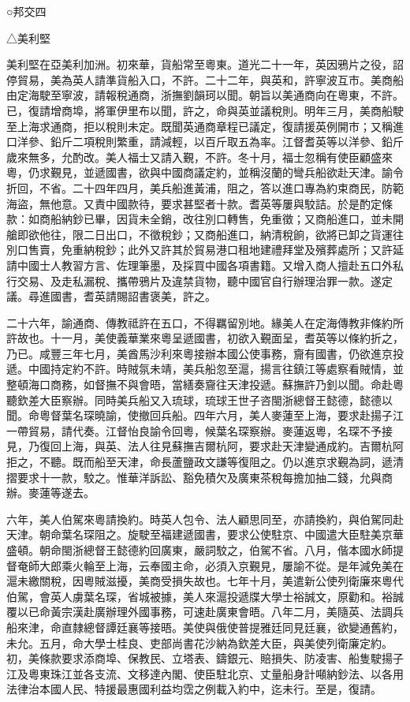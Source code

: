 
\begin{pinyinscope}
○邦交四

△美利堅

美利堅在亞美利加洲。初來華，貨船常至粵東。道光二十一年，英因鴉片之役，詔停貿易，美為英人請準貨船入口，不許。二十二年，與英和，許寧波互巿。美商船由定海駛至寧波，請報稅通商，浙撫劉韻珂以聞。朝旨以美通商向在粵東，不許。已，復請增商埠，將軍伊里布以聞，許之，命與英並議稅則。明年三月，美商船駛至上海求通商，拒以稅則未定。既聞英通商章程已議定，復請援英例開巿；又稱進口洋參、鉛斤二項稅則繁重，請減輕，以百斤取五為率。江督耆英等以洋參、鉛斤歲來無多，允酌改。美人福士又請入覲，不許。冬十月，福士忽稱有使臣顧盛來粵，仍求覲見，並遞國書，欲與中國商議定約，並稱沒蘭的彎兵船欲赴天津。諭令折回，不省。二十四年四月，美兵船進黃浦，阻之，答以進口專為約束商民，防範海盜，無他意。又責中國款待，要求甚堅者十款。耆英等屢與駮詰。於是酌定條款：如商船納鈔已畢，因貨未全銷，改往別口轉售，免重徵；又商船進口，並未開艙即欲他往，限二日出口，不徵稅鈔；又商船進口，納清稅餉，欲將已卸之貨運往別口售賣，免重納稅鈔；此外又許其於貿易港口租地建禮拜堂及殯葬處所；又許延請中國士人教習方言、佐理筆墨，及採買中國各項書籍。又增入商人擅赴五口外私行交易、及走私漏稅、攜帶鴉片及違禁貨物，聽中國官自行辦理治罪一款。遂定議。尋進國書，耆英請賜詔書褒美，許之。

二十六年，諭通商、傳教祗許在五口，不得羈留別地。緣美人在定海傳教非條約所許故也。十一月，美使義華業來粵呈遞國書，初欲入覲面呈，耆英等以條約折之，乃已。咸豐三年七月，美酋馬沙利來粵接辦本國公使事務，齎有國書，仍欲進京投遞。中國持定約不許。時賊氛未靖，美兵船忽至滬，揚言往鎮江等處察看賊情，並整頓海口商務，如督撫不與會晤，當繕奏齎往天津投遞。蘇撫許乃釗以聞。命赴粵聽欽差大臣察辦。同時美兵船又入琉球，琉球王世子咨閩浙總督王懿德，懿德以聞。命粵督葉名琛曉諭，使撤回兵船。四年六月，美人麥蓮至上海，要求赴揚子江一帶貿易，請代奏。江督怡良諭令回粵，候葉名琛察辦。麥蓮返粵，名琛不予接見，乃復回上海，與英、法人往見蘇撫吉爾杭阿，要求赴天津變通成約。吉爾杭阿拒之，不聽。既而船至天津，命長蘆鹽政文謙等復阻之。仍以進京求覲為詞，遞清摺要求十一款，駮之。惟華洋訴訟、豁免積欠及廣東茶稅每擔加抽二錢，允與商辦。麥蓮等遂去。

六年，美人伯駕來粵請換約。時英人包令、法人顧思同至，亦請換約，與伯駕同赴天津。朝命葉名琛阻之。旋駛至福建遞國書，要求公使駐京、中國遣大臣駐美京華盛頓。朝命閩浙總督王懿德約回廣東，嚴詞駮之，伯駕不省。八月，偕本國水師提督奄師大郎乘火輪至上海，云奉國主命，必須入京覲見，屢諭不從。是年減免美在滬未繳關稅，因粵賊滋擾，美商受損失故也。七年十月，美遣新公使列衛廉來粵代伯駕，會英人虜葉名琛，省城被據，美人來滬投遞牒大學士裕誠文，原勸和。裕誠覆以已命黃宗漢赴廣辦理外國事務，可速赴廣東會晤。八年二月，美隨英、法調兵船來津，命直隸總督譚廷襄等接晤。美使與俄使普提雅廷同見廷襄，欲變通舊約，未允。五月，命大學士桂良、吏部尚書花沙納為欽差大臣，與美使列衛廉定約。初，美條款要求添商埠、保教民、立塔表、鑄銀元、賠損失、防凌害、船隻駛揚子江及粵東珠江並各支流、文移達內閣、使臣駐北京、丈量船身計噸納鈔法、以各用法律治本國人民、特援最惠國利益均霑之例載入約中，迄未行。至是，復請。


\end{pinyinscope}
